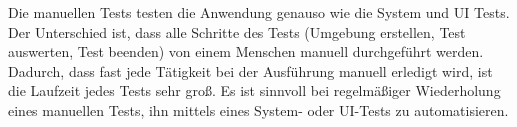 Die manuellen Tests testen die Anwendung genauso wie die System und UI Tests. 
Der Unterschied ist, dass alle Schritte des Tests (Umgebung erstellen, Test auswerten, Test beenden) von einem Menschen manuell durchgeführt werden.
Dadurch, dass fast jede Tätigkeit bei der Ausführung manuell erledigt wird, ist die Laufzeit jedes Tests sehr groß.
Es ist sinnvoll bei regelmäßiger Wiederholung eines manuellen Tests, ihn mittels eines System- oder UI-Tests zu automatisieren.